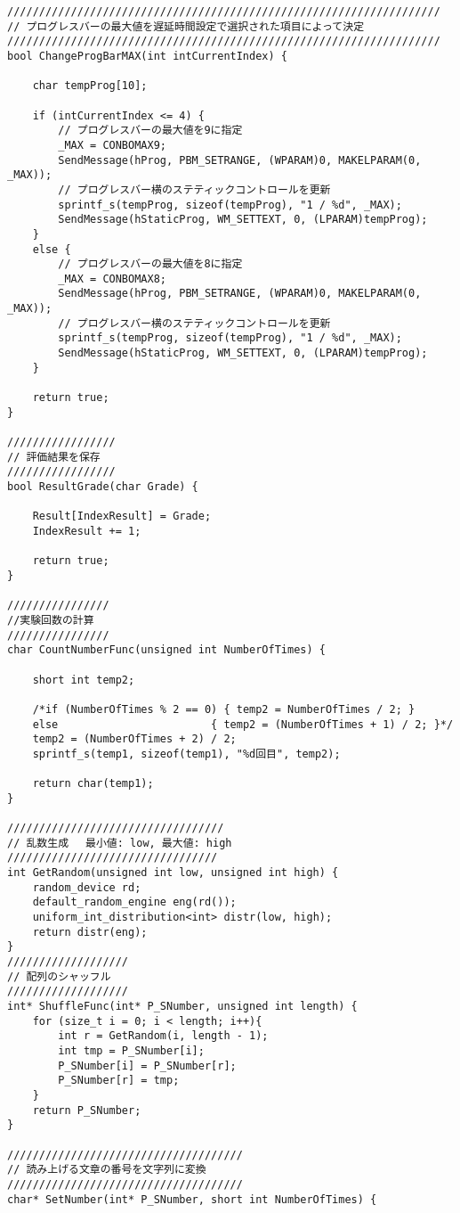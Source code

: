 \begin{lstlisting}[caption=main.cpp]
////////////////////////////////////////////////////////////////////
// プログレスバーの最大値を遅延時間設定で選択された項目によって決定
////////////////////////////////////////////////////////////////////
bool ChangeProgBarMAX(int intCurrentIndex) {

	char tempProg[10];

	if (intCurrentIndex <= 4) {
		// プログレスバーの最大値を9に指定
		_MAX = CONBOMAX9;
		SendMessage(hProg, PBM_SETRANGE, (WPARAM)0, MAKELPARAM(0, _MAX));
		// プログレスバー横のステティックコントロールを更新
		sprintf_s(tempProg, sizeof(tempProg), "1 / %d", _MAX);
		SendMessage(hStaticProg, WM_SETTEXT, 0, (LPARAM)tempProg);
	}
	else {
		// プログレスバーの最大値を8に指定
		_MAX = CONBOMAX8;
		SendMessage(hProg, PBM_SETRANGE, (WPARAM)0, MAKELPARAM(0, _MAX));
		// プログレスバー横のステティックコントロールを更新
		sprintf_s(tempProg, sizeof(tempProg), "1 / %d", _MAX);
		SendMessage(hStaticProg, WM_SETTEXT, 0, (LPARAM)tempProg);
	}

	return true;
}

/////////////////
// 評価結果を保存
/////////////////
bool ResultGrade(char Grade) {

	Result[IndexResult] = Grade;
	IndexResult += 1;

	return true;
}

////////////////
//実験回数の計算
////////////////
char CountNumberFunc(unsigned int NumberOfTimes) {

	short int temp2;

	/*if (NumberOfTimes % 2 == 0) { temp2 = NumberOfTimes / 2; }
	else                        { temp2 = (NumberOfTimes + 1) / 2; }*/
	temp2 = (NumberOfTimes + 2) / 2;
	sprintf_s(temp1, sizeof(temp1), "%d回目", temp2);

	return char(temp1);
}

//////////////////////////////////
// 乱数生成 　最小値: low, 最大値: high
/////////////////////////////////
int GetRandom(unsigned int low, unsigned int high) {
	random_device rd;
	default_random_engine eng(rd());
	uniform_int_distribution<int> distr(low, high);
	return distr(eng);
}
///////////////////
// 配列のシャッフル
///////////////////
int* ShuffleFunc(int* P_SNumber, unsigned int length) {
	for (size_t i = 0; i < length; i++){
		int r = GetRandom(i, length - 1);
		int tmp = P_SNumber[i];
		P_SNumber[i] = P_SNumber[r];
		P_SNumber[r] = tmp;
	}
	return P_SNumber;
}

/////////////////////////////////////
// 読み上げる文章の番号を文字列に変換
/////////////////////////////////////
char* SetNumber(int* P_SNumber, short int NumberOfTimes) {


\end{lstlisting}
